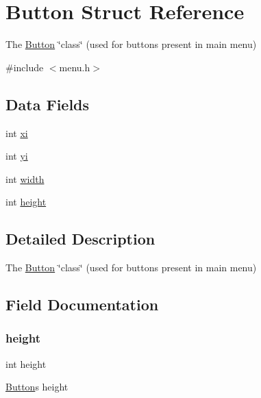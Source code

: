 \hypertarget{struct_button}{}\section{Button Struct Reference}
\label{struct_button}


The \hyperlink{struct_button}{Button} \char`\"{}class\char`\"{} (used for buttons present in main menu)  




{\ttfamily \#include $<$menu.\+h$>$}

\subsection*{Data Fields}
\begin{DoxyCompactItemize}
\item 
int \hyperlink{struct_button_af55497c668909df153bd9818cf765594}{xi}
\item 
int \hyperlink{struct_button_a525987ab72296fdd74c5bad7185fc0a4}{yi}
\item 
int \hyperlink{struct_button_a2474a5474cbff19523a51eb1de01cda4}{width}
\item 
int \hyperlink{struct_button_ad12fc34ce789bce6c8a05d8a17138534}{height}
\end{DoxyCompactItemize}


\subsection{Detailed Description}
The \hyperlink{struct_button}{Button} \char`\"{}class\char`\"{} (used for buttons present in main menu) 

\subsection{Field Documentation}
\hypertarget{struct_button_ad12fc34ce789bce6c8a05d8a17138534}{}\label{struct_button_ad12fc34ce789bce6c8a05d8a17138534} 
\subsubsection{\texorpdfstring{height}{height}}
{\footnotesize\ttfamily int height}

\hyperlink{struct_button}{Button}\textquotesingle{}s height \hypertarget{struct_button_a2474a5474cbff19523a51eb1de01cda4}{}\label{struct_button_a2474a5474cbff19523a51eb1de01cda4} 
